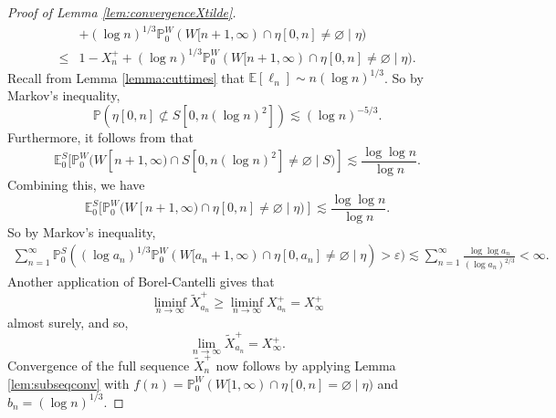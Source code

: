 \documentclass{article}
\renewcommand{\P}{\mathbb{P}}
\newcommand{\E}{\mathbb{E}}
\newcommand{\1}{\mathbf{1}}
\renewcommand{\l}{\ell}
\theoremstyle{definition}
\numberwithin{equation}{section}
\numberwithin{theorem}{section}
\begin{document}
\begin{proof}[Proof of Lemma \ref{lem:convergenceXtilde}]
\begin{equation}
\begin{split}
        &+(\log n)^{1/3}\P^W_0(W[n+1,\infty)\cap\eta[0,n]\neq\varnothing\mid\eta)\\
        \leq&1-X^+_n+(\log n)^{1/3}\P^W_0(W[n+1,\infty)\cap\eta[0,n]\neq\varnothing\mid\eta).
    \end{split}
\end{equation}
Recall from Lemma \ref{lemma:cuttimes} that $\E[\l_n]\sim n(\log n)^{1/3}$. So by Markov's inequality, 
\begin{equation}
	\P(\eta[0,n]\not\subset S[0,n(\log n)^2])\lesssim(\log n)^{-5/3}.
\end{equation}
Furthermore, it follows from \cite[Theorem 1.1]{albeverio96intersections} that 
\begin{equation}
	\E^S_0[\P^W_0(W[n+1,\infty)\cap S[0,n(\log n)^2]\neq\varnothing\mid S)]\lesssim\frac{\log\log n}{\log n}.
\end{equation}
Combining this, we have 
\begin{equation}
	\E^S_0[\P^W_0(W[n+1,\infty)\cap\eta[0,n]\neq\varnothing\mid\eta)]\lesssim\frac{\log\log n}{\log n}.
\end{equation}
So by Markov's inequality,
\begin{equation}
    \begin{split}
        \sum_{n=1}^{\infty}\P_0^S((\log a_n)^{1/3}\P^W_0(W[a_n+1,\infty)\cap \eta[0,a_n]\neq\varnothing\mid \eta)>\varepsilon)\lesssim\sum_{n=1}^\infty\frac{\log\log a_n}{(\log a_n)^{2/3}}<\infty.
    \end{split}
\end{equation}
Another application of Borel-Cantelli gives that 
\begin{equation}
\liminf_{n\rightarrow\infty}\widetilde{X}_{a_n}^+\geq\liminf_{n\rightarrow\infty}X_{a_n}^+=X_\infty^+
\end{equation}
almost surely, and so,
\begin{equation}
\lim_{n\rightarrow\infty}\widetilde{X}_{a_n}^+=X_\infty^+.
\end{equation}
Convergence of the full sequence $\widetilde{X}_n^+$ now follows by applying Lemma \ref{lem:subseqconv} with $f(n)=\P_0^W(W[1,\infty)\cap\eta[0,n]=\varnothing\mid\eta)$ and $b_n=(\log n)^{1/3}$.


\end{proof}
\end{document}
